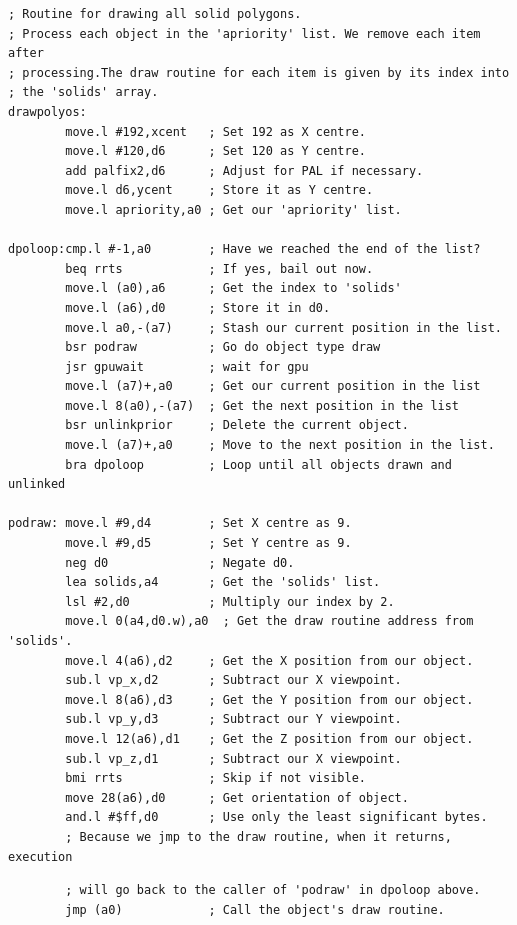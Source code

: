 \begin{lstlisting}
; Routine for drawing all solid polygons.
; Process each object in the 'apriority' list. We remove each item after
; processing.The draw routine for each item is given by its index into
; the 'solids' array.
drawpolyos:
        move.l #192,xcent   ; Set 192 as X centre.
        move.l #120,d6      ; Set 120 as Y centre.
        add palfix2,d6      ; Adjust for PAL if necessary.
        move.l d6,ycent     ; Store it as Y centre.
        move.l apriority,a0 ; Get our 'apriority' list.

dpoloop:cmp.l #-1,a0        ; Have we reached the end of the list?
        beq rrts            ; If yes, bail out now.
        move.l (a0),a6      ; Get the index to 'solids'
        move.l (a6),d0      ; Store it in d0.
        move.l a0,-(a7)     ; Stash our current position in the list.
        bsr podraw          ; Go do object type draw
        jsr gpuwait         ; wait for gpu
        move.l (a7)+,a0     ; Get our current position in the list
        move.l 8(a0),-(a7)  ; Get the next position in the list
        bsr unlinkprior     ; Delete the current object.
        move.l (a7)+,a0     ; Move to the next position in the list.
        bra dpoloop         ; Loop until all objects drawn and unlinked
 
podraw: move.l #9,d4        ; Set X centre as 9.
        move.l #9,d5        ; Set Y centre as 9.
        neg d0              ; Negate d0.
        lea solids,a4       ; Get the 'solids' list.
        lsl #2,d0           ; Multiply our index by 2.
        move.l 0(a4,d0.w),a0  ; Get the draw routine address from 'solids'.
        move.l 4(a6),d2     ; Get the X position from our object.
        sub.l vp_x,d2       ; Subtract our X viewpoint.
        move.l 8(a6),d3     ; Get the Y position from our object.
        sub.l vp_y,d3       ; Subtract our Y viewpoint.
        move.l 12(a6),d1    ; Get the Z position from our object.
        sub.l vp_z,d1       ; Subtract our X viewpoint.
        bmi rrts            ; Skip if not visible.
        move 28(a6),d0      ; Get orientation of object.
        and.l #$ff,d0       ; Use only the least significant bytes.
        ; Because we jmp to the draw routine, when it returns, execution
\end{lstlisting}
\begin{lstlisting}
        ; will go back to the caller of 'podraw' in dpoloop above.
        jmp (a0)            ; Call the object's draw routine.
\end{lstlisting}

